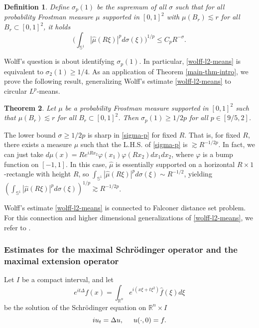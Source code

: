 \documentclass{amsart}
\numberwithin{equation}{section}
\newtheorem{theorem}{Theorem}[section]
\newtheorem{definition}[theorem]{Definition}
\newcommand{\De}{\Delta}
\newcommand{\si}{\sigma}
\newcommand{\vp}{\varphi}
\newcommand{\wh}{\widehat}
\newcommand{\ZR}{\mathbb{R}}
\newcommand{\ZS}{\mathbb{S}}
\begin{document}
\begin{definition}
Define $\si_p(1)$ be the supremum of all $\si$ such that for all probability Frostman measure $\mu$ supported in $[0,1]^2$ with $\mu(B_r)\lesssim r$ for all $B_r\subset [0,1]^2$, it holds
\begin{equation}
\label{sigma-p}
    \Big(\int_{\ZS^1}|\wh \mu(R\xi)|^pd\si(\xi)\Big)^{1/p}\leq C_p R^{-\si}. 
\end{equation}    
\end{definition}

Wolff's question is about identifying $\si_p(1)$.
In particular, \eqref{wolff-l2-means} is equivalent to $\si_2(1)\geq1/4$.
As an application of Theorem \ref{main-thm-intro}, we prove the following result, generalizing Wolff's estimate \eqref{wolff-l2-means} to circular $L^p$-means. 
\begin{theorem}
\label{circular-thm}
Let $\mu$ be a probability Frostman measure supported in $[0,1]^2$ such that $\mu(B_r)\lesssim r$ for all $B_r\subset [0,1]^2$.
Then $\si_p(1)\geq 1/2p$ for all $p\in[9/5,2]$.
\end{theorem}

The lower bound $\si\geq1/2p$ is sharp in \eqref{sigma-p} for fixed $R$.
That is, for fixed $R$, there exists a measure $\mu$ such that the L.H.S. of \eqref{sigma-p} is $\gtrsim R^{-1/2p}$.
In fact, we can just take $d\mu(x)=Re^{iRx_2}\vp(x_1)\vp(Rx_2)dx_1dx_2$, where $\vp$ is a bump function on $[-1,1]$.
In this case, $\wh\mu$ is essentially supported on a horizontal $R\times 1$-rectangle with height $R$, so $\int_{\ZS^1}|\wh \mu(R\xi)|^pd\si(\xi)\sim R^{-1/2}$, yielding $(\int_{\ZS^1}|\wh \mu(R\xi)|^pd\si(\xi))^{1/p}\gtrsim  R^{-1/2p}$.

\smallskip 

Wolff's estimate \eqref{wolff-l2-means} is connected to Falconer distance set problem.
For this connection and higher dimensional generalizations of \eqref{wolff-l2-means}, we refer to \cite{Du-Zhang}.

\medskip

\subsubsection{Estimates for the maximal Schr\"odinger operator and the maximal extension operator}

Let $I$ be a compact interval, and let 
\begin{equation}
   e^{it\De}f(x)=\int_{\ZR^n}e^{i(x\xi+t\xi^2)}\wh f(\xi)d\xi 
\end{equation}
be the solution of the  Schr\"odinger equation on $\ZR^n\times I$
\begin{equation}
iu_t=\De u,\hspace{.5cm}u(\cdot,0)=f.
\end{equation}
\end{document}
